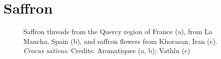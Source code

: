 \section{Saffron}
\label{sec:saffron}



\begin{figure}[!ht]
	\vspace{-4ex}
	\centering
	\hfill
	\hfill
	\caption[Saffron threads and flowers]{Saffron threads from the Quercy region of France (a), from La Mancha, Spain (b), and saffron flowers from Khorasan, Iran (c). \textit{Crocus sativus}. Credits: Aromatiques (a, b); Vathlu (c)\protect\footnotemark}
	\label{fig:saffron_imgs}
\end{figure}


